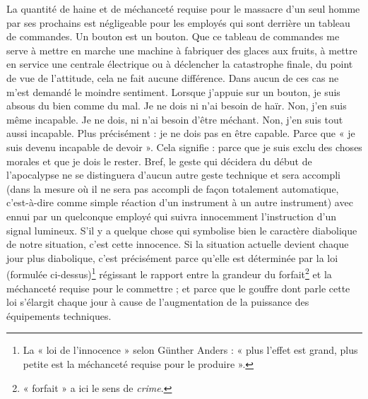 
	{La quantité de haine et de méchanceté requise pour le massacre d’un seul homme par ses prochains est négligeable pour les employés qui sont derrière un tableau de commandes. Un bouton est un bouton. Que ce tableau de commandes me serve à mettre en marche une machine à fabriquer des glaces aux fruits, à mettre en service une centrale électrique ou à déclencher la catastrophe finale, du point de vue de l’attitude, cela ne fait aucune différence. Dans aucun de ces cas ne m’est demandé le moindre sentiment. Lorsque j’appuie sur un bouton, je suis absous du bien comme du mal. Je ne dois ni n’ai besoin de haïr. Non, j’en suis même incapable. Je ne dois, ni n’ai besoin d’être méchant. Non, j’en suis tout aussi incapable. Plus précisément : je ne dois pas en être capable. Parce que « je suis devenu incapable de devoir ». Cela signifie : parce que je suis exclu des choses morales et que je dois le rester. Bref, le geste qui décidera du début de l’apocalypse ne se distinguera d’aucun autre geste technique et sera accompli (dans la mesure où il ne sera pas accompli de façon totalement automatique, c’est-à-dire comme simple réaction d’un instrument à un autre instrument) avec ennui par un quelconque employé qui suivra innocemment l’instruction d’un signal lumineux. S’il y a quelque chose qui symbolise bien le caractère diabolique de notre situation, c’est cette innocence. Si la situation actuelle devient chaque jour plus diabolique, c’est précisément parce qu’elle est déterminée par la loi (formulée ci-dessus)\footnote{La « loi de l’innocence » selon Günther Anders : « plus l’effet est grand, plus petite est la méchanceté requise pour le produire ».} régissant le rapport entre la grandeur du forfait\footnote{« forfait » a ici le sens de \emph{crime}.} et la méchanceté requise pour le commettre ; et parce que le gouffre dont parle cette loi s’élargit chaque jour à cause de l’augmentation de la puissance des équipements techniques.
	
}
